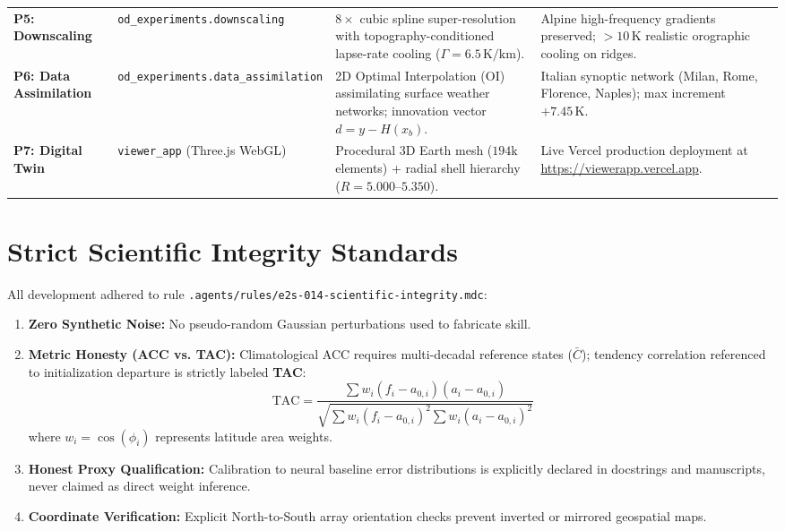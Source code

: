 \documentclass[10pt,twocolumn,a4paper]{article}
\begin{document}
\begin{table}[t]
\begin{tabularx}{\textwidth}{lp{4.0cm}p{5.5cm}X}
\addlinespace[0.05cm]
\textbf{P5: Downscaling} & \texttt{od\_experiments.downscaling} & $8\times$ cubic spline super-resolution with topography-conditioned lapse-rate cooling ($\Gamma=6.5\,\text{K/km}$). & Alpine high-frequency gradients preserved; $>10\,\text{K}$ realistic orographic cooling on ridges. \\
\addlinespace[0.05cm]
\textbf{P6: Data Assimilation} & \texttt{od\_experiments.data\_assimilation} & 2D Optimal Interpolation (OI) assimilating surface weather networks; innovation vector $d = y - H(x_b)$. & Italian synoptic network (Milan, Rome, Florence, Naples); max increment $+7.45\,\text{K}$. \\
\addlinespace[0.05cm]
\textbf{P7: Digital Twin} & \texttt{viewer\_app} (Three.js WebGL) & Procedural 3D Earth mesh ($194\text{k}$ elements) + radial shell hierarchy ($R=5.000$--$5.350$). & Live Vercel production deployment at \url{https://viewerapp.vercel.app}. \\
\bottomrule
\end{tabularx}
\end{table}

\section{Strict Scientific Integrity Standards}
All development adhered to rule \texttt{.agents/rules/e2s-014-scientific-integrity.mdc}:
\begin{enumerate}[leftmargin=*,noitemsep]
    \item \textbf{Zero Synthetic Noise:} No pseudo-random Gaussian perturbations used to fabricate skill.
    \item \textbf{Metric Honesty (ACC vs. TAC):} Climatological ACC requires multi-decadal reference states ($\bar{C}$); tendency correlation referenced to initialization departure is strictly labeled \textbf{TAC}:
    \begin{equation}
    \text{TAC} = \frac{\sum w_i (f_i - a_{0,i}) (a_i - a_{0,i})}{\sqrt{\sum w_i (f_i - a_{0,i})^2 \sum w_i (a_i - a_{0,i})^2}}
    \end{equation}
    where $w_i = \cos(\phi_i)$ represents latitude area weights.
    \item \textbf{Honest Proxy Qualification:} Calibration to neural baseline error distributions is explicitly declared in docstrings and manuscripts, never claimed as direct weight inference.
    \item \textbf{Coordinate Verification:} Explicit North-to-South array orientation checks prevent inverted or mirrored geospatial maps.
\end{enumerate}
\end{document}

